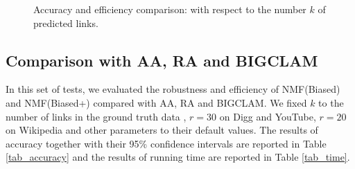 \documentclass[10pt,journal,compsoc]{IEEEtran}
\newcommand{\Biased}{{\sf NMF(Biased)}\xspace}
\newcommand{\Aa}{{\sf AA}\xspace }
\newcommand{\RA}{{\sf RA}\xspace }
\newcommand{\BIGCLAM}{{\sf BIGCLAM}\xspace}
\newcommand{\Digg}{{\sf Digg}\xspace}
\newcommand{\YouTube}{{\sf YouTube}\xspace}
\newcommand{\Wikipedia}{{\sf Wikipedia}\xspace}
\newcommand{\Biasedp}{{\sf NMF(Biased+)}\xspace}
\begin{document}
\begin{figure}[tb!]
  \hspace{-3ex}
  \hspace{-3ex}
  \hspace{-3ex}
  \vspace{-1ex}
  \caption{Accuracy and efficiency comparison: with respect to the number $k$ of predicted links.}\label{fig_exp_2_1}
  \vspace{-2ex}
\end{figure}



\subsection{Comparison with \Aa, \RA and \BIGCLAM}
In this set of tests, we evaluated the robustness and efficiency of \Biased and \Biasedp
compared with \Aa, \RA and \BIGCLAM. We fixed $k$ to the number of links
in the ground truth data \cite{yang2015}, $r = 30$ on \Digg and \YouTube, $r = 20$ on \Wikipedia
and other parameters to their default values.
The results of accuracy together with their 95\% confidence intervals are reported
in Table \ref{tab_accuracy} and the results of running time are reported in Table \ref{tab_time}.
\end{document}
